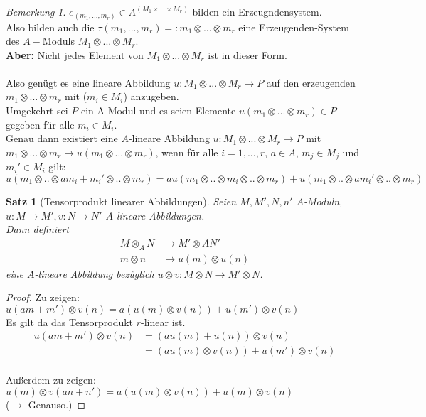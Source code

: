\documentclass[10pt,a4paper]{article}
\newcounter{thm}[section]
\theoremstyle{definition}
\theoremstyle{plain}
\newtheorem{satz}[thm]{Satz}
\theoremstyle{remark}
\newtheorem{bem}[thm]{Bemerkung}
\begin{document}
\begin{bem}\label{304bem}
	$e_{(m_1,...,m_r)}\in A^{(M_1\times...\times M_r)}$ bilden ein Erzeugndensystem.\\
	Also bilden auch die $\tau(m_1,...,m_r)=:m_1\otimes...\otimes m_r$ eine Erzeugenden-System des $A-$Moduls $M_1\otimes...\otimes M_r$.\\
	\textbf{Aber:} Nicht jedes Element von $M_1\otimes...\otimes M_r$ ist in dieser Form.\\
	\\
	Also genügt es eine lineare Abbildung $u:M_1\otimes...\otimes M_r\rightarrow P$ auf den erzeugenden $m_1\otimes...\otimes m_r$ mit ($m_i\in M_i$) anzugeben.\\
	Umgekehrt sei $P$ ein A-Modul und es seien Elemente $u(m_1\otimes...\otimes m_r)\in P$ gegeben für alle $m_i\in M_i$.\\
	Genau dann existiert eine $A$-lineare Abbildung $u:M_1\otimes...\otimes M_r\rightarrow P$ mit $m_1\otimes ...\otimes m_r\mapsto u(m_1\otimes ...\otimes m_r)$, wenn für alle $i=1,...,r$, $a\in A$, $m_j\in M_j$ und $m_i'\in M_i$ gilt:
	\[u(m_1\otimes ..\otimes a m_i+m_i'\otimes..\otimes m_r)=a u(m_1\otimes ..\otimes m_i\otimes..\otimes m_r)+u(m_1\otimes ..\otimes a m_i'\otimes..\otimes m_r)\]
\end{bem}
\begin{satz}[Tensorprodukt linearer Abbildungen]
	Seien $M,M',N,n'$ $A$-Moduln, $u:M\rightarrow M',v:N\rightarrow N'$ $A$-lineare Abbildungen.\\
	Dann definiert
	\begin{align*}
	M\otimes_A N&\rightarrow M'\otimes A N'\\
	m\otimes n &\mapsto u(m)\otimes u(n)
	\end{align*}
	eine $A$-lineare Abbildung bezüglich $u\otimes v:M\otimes N\rightarrow M'\otimes N$.
\end{satz}
\begin{proof}
	Zu zeigen: $u(am+m')\otimes v(n)=a(u(m)\otimes v(n))+u(m')\otimes v(n)$\\
	Es gilt da das Tensorprodukt $r$-linear ist.
	\begin{align*}
	u(am+m')\otimes v(n)&=(au(m)+u(n))\otimes v(n)\\
	&=(au(m)\otimes v(n))+u(m')\otimes v(n)
	\end{align*}
	\\
	Außerdem zu zeigen: $u(m)\otimes v(an+n')=a(u(m)\otimes v(n))+u(m)\otimes v(n)$\\
	($\rightarrow $ Genauso.)
\end{proof}
\end{document}
